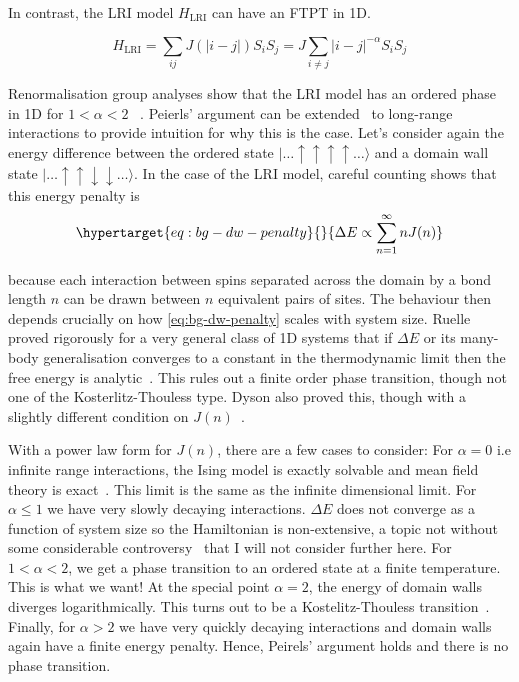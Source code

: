 In contrast, the LRI model \(H_{\mathrm{LRI}}\) can have an FTPT in 1D.

\[H_{\mathrm{LRI}} = \sum_{ij} J(|i-j|) S_i S_j = J \sum_{i\neq j} |i - j|^{-\alpha} S_i S_j\]

Renormalisation group analyses show that the LRI model has an ordered phase in 1D for \(1 < \alpha < 2\) ~\autocite{dysonExistencePhasetransitionOnedimensional1969}. Peierls' argument can be extended~\autocite{thoulessLongRangeOrderOneDimensional1969} to long-range interactions to provide intuition for why this is the case. Let's consider again the energy difference between the ordered state \(|\ldots\uparrow\uparrow\uparrow\uparrow\ldots\rangle\) and a domain wall state \(|\ldots\uparrow\uparrow\downarrow\downarrow\ldots\rangle\). In the case of the LRI model, careful counting shows that this energy penalty is \begin{equation}\protect\hypertarget{eq:bg-dw-penalty}{}{\Delta E \propto \sum_{n=1}^{\infty} n J(n)}\label{eq:bg-dw-penalty}\end{equation}

because each interaction between spins separated across the domain by a bond length \(n\) can be drawn between \(n\) equivalent pairs of sites. The behaviour then depends crucially on how \cref{eq:bg-dw-penalty} scales with system size. Ruelle proved rigorously for a very general class of 1D systems that if \(\Delta E\) or its many-body generalisation converges to a constant in the thermodynamic limit then the free energy is analytic~\autocite{ruelleStatisticalMechanicsOnedimensional1968}. This rules out a finite order phase transition, though not one of the Kosterlitz-Thouless type. Dyson also proved this, though with a slightly different condition on \(J(n)\)~\autocite{dysonExistencePhasetransitionOnedimensional1969}.

With a power law form for \(J(n)\), there are a few cases to consider: For \(\alpha = 0\) i.e infinite range interactions, the Ising model is exactly solvable and mean field theory is exact~\autocite{lipkinValidityManybodyApproximation1965}. This limit is the same as the infinite dimensional limit. For \(\alpha \leq 1\) we have very slowly decaying interactions. \(\Delta E\) does not converge as a function of system size so the Hamiltonian is non-extensive, a topic not without some considerable controversy~\autocite{grossNonextensiveHamiltonianSystems2002,lutskoQuestioningValidityNonextensive2011,wangCommentNonextensiveHamiltonian2003} that I will not consider further here. For \(1 < \alpha < 2\), we get a phase transition to an ordered state at a finite temperature. This is what we want! At the special point \(\alpha = 2\), the energy of domain walls diverges logarithmically. This turns out to be a Kostelitz-Thouless transition~\autocite{thoulessLongRangeOrderOneDimensional1969}. Finally, for \(\alpha > 2\) we have very quickly decaying interactions and domain walls again have a finite energy penalty. Hence, Peirels' argument holds and there is no phase transition.

